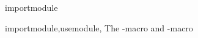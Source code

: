 \documentclass{stex}
\begin{document}
  \begin{smodule}[title=Import Macros]{importmodule}
  
  \begin{sfunction}{importmodule,usemodule}{\importmodule,\usemodule}
    The \dcs-macro and \ds[usemodule]-macro
  \end{sfunction}
   
  \end{smodule}
\end{document}
